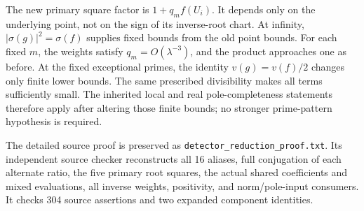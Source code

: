 The new primary square factor is $1+q_mf(U_i)$. It depends only on the
underlying point, not on the sign of its inverse-root chart. At infinity,
$|\sigma(g)|^2=\sigma(f)$ supplies fixed bounds from the old point bounds.
For each fixed $m$, the weights satisfy $q_m=O(\lambda^{-3})$, and the
product approaches one as before. At the fixed exceptional primes, the
identity $v(g)=v(f)/2$ changes only finite lower bounds. The same prescribed
divisibility makes all terms sufficiently small. The inherited local and
real pole-completeness statements therefore apply after altering those
finite bounds; no stronger prime-pattern hypothesis is required.

The detailed source proof is preserved as
\texttt{detector\_reduction\_proof.txt}. Its independent source checker
reconstructs all 16 aliases, full conjugation of each alternate ratio,
the five primary root squares, the actual shared coefficients and mixed
evaluations, all inverse weights, positivity, and norm/pole-input consumers.
It checks 304 source assertions and two expanded component identities.
